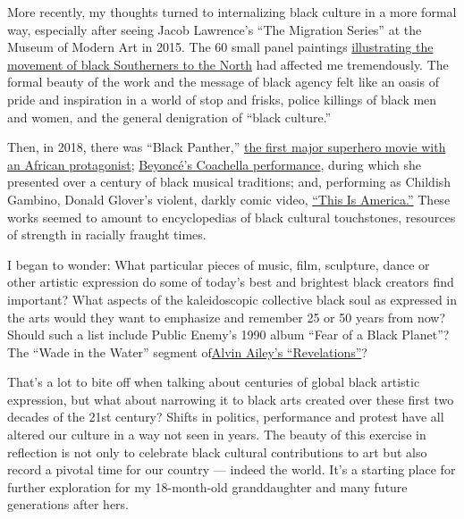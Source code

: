 More recently, my thoughts turned to internalizing black culture in a
more formal way, especially after seeing Jacob Lawrence's ``The
Migration Series'' at the Museum of Modern Art in 2015. The 60 small
panel paintings
\href{https://www.khanacademy.org/humanities/ap-art-history/later-europe-and-americas/modernity-ap/v/lawrence-migration-series}{illustrating
the movement of black Southerners to the North} had affected me
tremendously. The formal beauty of the work and the message of black
agency felt like an oasis of pride and inspiration in a world of stop
and frisks, police killings of black men and women, and the general
denigration of ``black culture.''

Then, in 2018, there was ``Black Panther,''
\href{https://www.nytimes3xbfgragh.onion/2018/02/12/movies/black-panther-marvel-chadwick-boseman-ryan-coogler-lupita-nyongo.html}{the
first major superhero movie with an African protagonist};
\href{https://www.nytimes3xbfgragh.onion/2018/04/15/arts/music/beyonce-coachella-review.html}{Beyoncé's
Coachella performance}, during which she presented over a century of
black musical traditions; and, performing as Childish Gambino, Donald
Glover's violent, darkly comic video,
\href{https://www.youtube.com/watch?v=VYOjWnS4cMY}{``This Is America.''}
These works seemed to amount to encyclopedias of black cultural
touchstones, resources of strength in racially fraught times.

I began to wonder: What particular pieces of music, film, sculpture,
dance or other artistic expression do some of today's best and brightest
black creators find important? What aspects of the kaleidoscopic
collective black soul as expressed in the arts would they want to
emphasize and remember 25 or 50 years from now? Should such a list
include Public Enemy's 1990 album ``Fear of a Black Planet''? The ``Wade
in the Water'' segment
of\href{http://pressroom.alvinailey.org/file/wade-in-the-water-from-alvin-ailey-s-revelations?action=}{Alvin
Ailey's ``Revelations''}?

That's a lot to bite off when talking about centuries of global black
artistic expression, but what about narrowing it to black arts created
over these first two decades of the 21st century? Shifts in politics,
performance and protest have all altered our culture in a way not seen
in years. The beauty of this exercise in reflection is not only to
celebrate black cultural contributions to art but also record a pivotal
time for our country --- indeed the world. It's a starting place for
further exploration for my 18-month-old granddaughter and many future
generations after hers.

